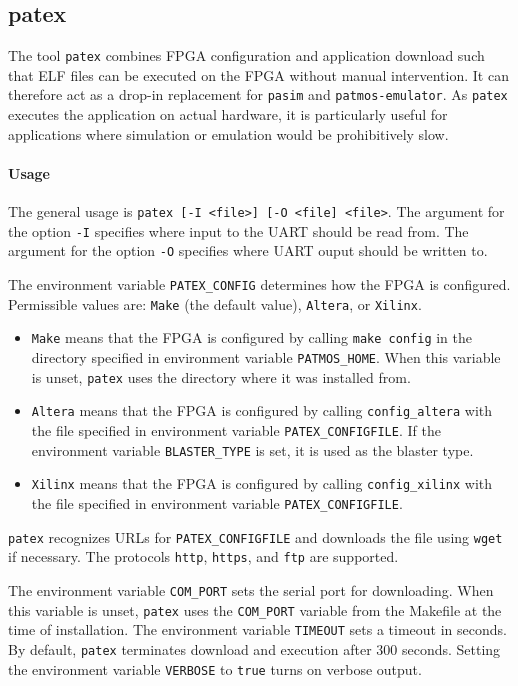 \documentclass[a4paper,fontsize=10pt,twoside,DIV15,BCOR12mm,headinclude=true,footinclude=false,pagesize,bibtotoc]{scrbook}
\begin{document}
\subsection{patex}

The tool \texttt{patex} combines FPGA configuration and application
download such that ELF files can be executed on the FPGA without
manual intervention. It can therefore act as a drop-in replacement for
\texttt{pasim} and \texttt{patmos-emulator}. As \texttt{patex}
executes the application on actual hardware, it is particularly useful
for applications where simulation or emulation would be prohibitively
slow.

\paragraph{Usage}

The general usage is \texttt{patex [-I <file>] [-O <file] <file>}. The
argument for the option \texttt{-I} specifies where input to the UART
should be read from. The argument for the option \texttt{-O} specifies
where UART ouput should be written to.

The environment variable \texttt{PATEX\_CONFIG} determines how the
FPGA is configured. Permissible values are: \texttt{Make} (the default
value), \texttt{Altera}, or \texttt{Xilinx}.
\begin{itemize}
\item \texttt{Make} means that the FPGA is configured by calling
  \texttt{make config} in the directory specified in environment
  variable \texttt{PATMOS\_HOME}. When this variable is unset,
  \texttt{patex} uses the directory where it was installed from.
\item \texttt{Altera} means that the FPGA is configured by calling
  \texttt{config\_altera} with the file specified in environment
  variable \texttt{PATEX\_CONFIGFILE}. If the environment variable
  \texttt{BLASTER\_TYPE} is set, it is used as the blaster type.
\item \texttt{Xilinx} means that the FPGA is configured by calling
  \texttt{config\_xilinx} with the file specified in environment
  variable \texttt{PATEX\_CONFIGFILE}.
\end{itemize}

\texttt{patex} recognizes URLs for \texttt{PATEX\_CONFIGFILE} and
downloads the file using \texttt{wget} if necessary. The protocols
\texttt{http}, \texttt{https}, and \texttt{ftp} are supported.

The environment variable \texttt{COM\_PORT} sets the serial port for
downloading. When this variable is unset, \texttt{patex} uses the
\texttt{COM\_PORT} variable from the Makefile at the time of
installation. The environment variable \texttt{TIMEOUT} sets a timeout
in seconds. By default, \texttt{patex} terminates download and
execution after 300 seconds. Setting the environment variable
\texttt{VERBOSE} to \texttt{true} turns on verbose output.
\end{document}
